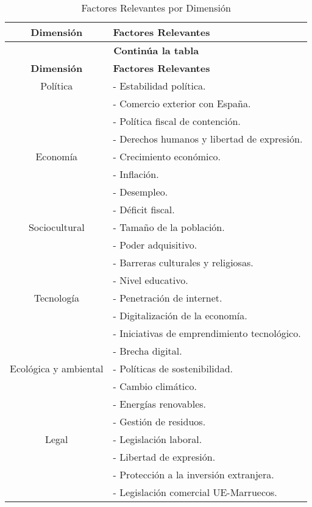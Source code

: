 \documentclass{article}  %
\begin{document}
\begin{longtable}{|c|l|}
\caption{Factores Relevantes por Dimensión} \label{tab:factores_relevantes} \\

\hline
\textbf{Dimensión} & \textbf{Factores Relevantes} \\
\hline
\endfirsthead

\hline
\multicolumn{2}{|c|}{\textbf{Continúa la tabla}} \\
\hline
\textbf{Dimensión} & \textbf{Factores Relevantes} \\
\hline
\endhead

\hline
\endfoot

\hline
Política & - Estabilidad política. \\ 
         & - Comercio exterior con España. \\ 
         & - Política fiscal de contención. \\ 
         & - Derechos humanos y libertad de expresión. \\ 
\hline
Economía & - Crecimiento económico. \\ 
         & - Inflación. \\ 
         & - Desempleo. \\ 
         & - Déficit fiscal. \\ 
\hline
Sociocultural & - Tamaño de la población. \\ 
              & - Poder adquisitivo. \\ 
              & - Barreras culturales y religiosas. \\ 
              & - Nivel educativo. \\ 
\hline
Tecnología & - Penetración de internet. \\ 
           & - Digitalización de la economía. \\ 
           & - Iniciativas de emprendimiento tecnológico. \\ 
           & - Brecha digital. \\ 
\hline
Ecológica y ambiental & - Políticas de sostenibilidad. \\ 
                       & - Cambio climático. \\ 
                       & - Energías renovables. \\ 
                       & - Gestión de residuos. \\ 
\hline
Legal & - Legislación laboral. \\ 
      & - Libertad de expresión. \\ 
      & - Protección a la inversión extranjera. \\ 
      & - Legislación comercial UE-Marruecos. \\ 
\hline
\end{longtable}
\end{document}
